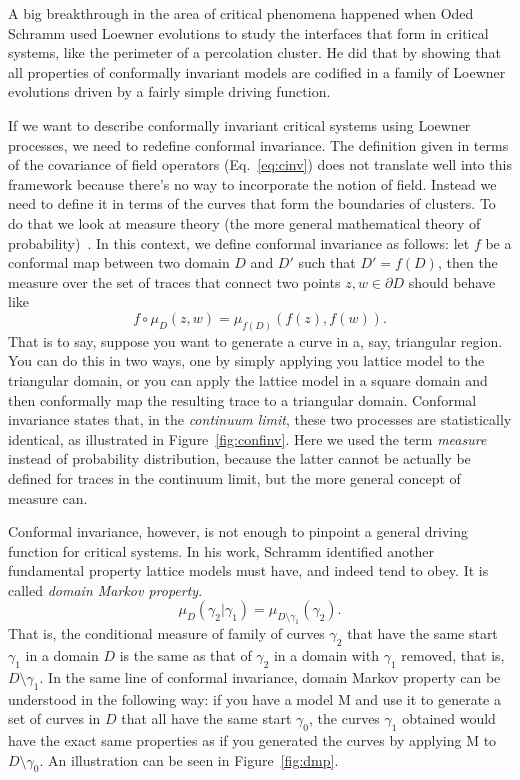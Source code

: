 A big breakthrough in the area of critical phenomena happened when Oded Schramm
used Loewner evolutions to study the interfaces that form in critical systems,
like the perimeter of a percolation cluster. He did that by showing that all
properties of conformally invariant models are codified in a family of Loewner
evolutions driven by a fairly simple driving function.

If we want to describe conformally invariant critical systems using Loewner
processes, we need to redefine conformal invariance. The definition given in
terms of the covariance of field operators (Eq.~\ref{eq:cinv}) does not
translate well into this framework because there's no way to incorporate the
notion of field. Instead we need to define it in terms of the curves that form
the boundaries of clusters. To do that we look at measure theory (the more
general mathematical theory of probability)~\cite{Ash2000}. In this context, we
define conformal invariance as follows: let $f$ be a conformal map between two
domain $D$ and $D'$ such that $D'=f(D)$, then the measure over the set of traces
that connect two points $z,w\in\partial D$ should behave like
\begin{equation}
    \newcommand{\pp}[1]{\left(#1\right)}
    f\circ\mu_D\pp{z,w} = \mu_{f(D)}\pp{f\pp{z}, f\pp{w}}.
\end{equation}
That is to say, suppose you want to generate a curve in a, say, triangular
region. You can do this in two ways, one by simply applying you lattice model
to the triangular domain, or you can apply the lattice model in a square domain
and then conformally map the resulting trace to a triangular domain. Conformal
invariance states that, in the \textit{continuum limit}, these two processes
are statistically identical, as illustrated in Figure~\ref{fig:confinv}. Here
we used the term \textit{measure} instead of probability distribution, because
the latter cannot be actually be defined for traces in the continuum limit, but
the more general concept of measure can.

Conformal invariance, however, is not enough to pinpoint a general driving
function for critical systems. In his work, Schramm identified another
fundamental property lattice models must have, and indeed tend to obey.
It is called \textit{domain Markov property}.
\begin{equation}
    \newcommand{\pp}[1]{\left(#1\right)}
    \mu_D\pp{\gamma_2|\gamma_1} = \mu_{D\setminus\gamma_1}\pp{\gamma_2}.
\end{equation}
That is, the conditional measure of family of curves $\gamma_2$ that have the
same start $\gamma_1$ in a domain $D$ is the same as that of $\gamma_2$ in
a domain with $\gamma_1$ removed, that is, $D\setminus\gamma_1$.
In the same line of conformal invariance, domain Markov property can be
understood in the following way: if you have a model M and use it to generate a
set of curves in $D$ that all have the same start $\gamma_0$, the curves
$\gamma_1$ obtained would have the exact same properties as if you generated
the curves by applying M to $D\setminus\gamma_0$. An illustration can be
seen in Figure~\ref{fig:dmp}.


